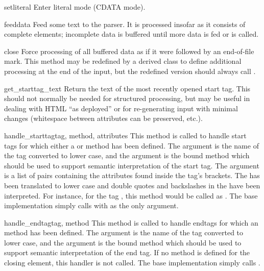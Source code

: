 \begin{methoddesc}{setliteral}{}
Enter literal mode (CDATA mode).
\end{methoddesc}

\begin{methoddesc}{feed}{data}
Feed some text to the parser.  It is processed insofar as it consists
of complete elements; incomplete data is buffered until more data is
fed or  is called.
\end{methoddesc}

\begin{methoddesc}{close}{}
Force processing of all buffered data as if it were followed by an
end-of-file mark.  This method may be redefined by a derived class to
define additional processing at the end of the input, but the
redefined version should always call .
\end{methoddesc}

\begin{methoddesc}{get_starttag_text}{}
Return the text of the most recently opened start tag.  This should
not normally be needed for structured processing, but may be useful in
dealing with HTML ``as deployed'' or for re-generating input with
minimal changes (whitespace between attributes can be preserved,
etc.).
\end{methoddesc}

\begin{methoddesc}{handle_starttag}{tag, method, attributes}
This method is called to handle start tags for which either a
 or  method has been
defined.  The  argument is the name of the tag converted to
lower case, and the  argument is the bound method which
should be used to support semantic interpretation of the start tag.
The  argument is a list of  pairs containing the attributes found inside the tag's
\code{<>} brackets.  The  has been translated to lower case
and double quotes and backslashes in the  have been interpreted.
For instance, for the tag , this
method would be called as .  The base implementation simply calls
 with  as the only argument.
\end{methoddesc}

\begin{methoddesc}{handle_endtag}{tag, method}
This method is called to handle endtags for which an
 method has been defined.  The
 argument is the name of the tag converted to lower case, and
the  argument is the bound method which should be used to
support semantic interpretation of the end tag.  If no
 method is defined for the closing element,
this handler is not called.  The base implementation simply calls
.
\end{methoddesc}

